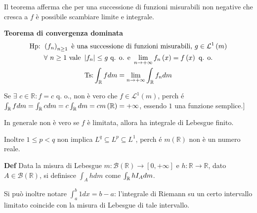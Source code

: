 \documentclass{article}
\begin{document}
Il teorema afferma che per una successione di funzioni misurabili non
negative che cresca a $f$ \`{e} possibile scambiare limite e integrale.

\textbf{Teorema di convergenza dominata}%
\begin{gather*}
\text{Hp: }\left( f_{n}\right) _{n\geq 1}\text{ \`{e} una successione di
funzioni misurabili, }g\in \mathcal{L}^{1}\left( m\right) \\
\forall \text{ }n\geq 1\text{ vale }\left\vert f_{n}\right\vert \leq g\text{
q. o. e }\lim_{n\rightarrow +\infty }f_{n}\left( x\right) =f\left( x\right) 
\text{ q. o.} \\
\text{Ts:}\int_{%
\mathbb{R}
}fdm=\lim_{n\rightarrow +\infty }\int_{%
\mathbb{R}
}f_{n}dm
\end{gather*}

Se $\exists $ $c\in 
\mathbb{R}
:f=c$ q. o., non \`{e} vero che $f\in \mathcal{L}^{1}\left( m\right) $, perch%
\'{e} $\int_{%
\mathbb{R}
}fdm=\int_{%
\mathbb{R}
}cdm=c\int_{%
\mathbb{R}
}dm=cm\left( 
\mathbb{R}
\right) =+\infty $, essendo $1$ una funzione semplice.]

In generale non \`{e} vero se $f$ \`{e} limitata, allora ha integrale di
Lebesgue finito.

Inoltre $1\leq p<q$ non implica $L^{q}\subseteq L^{p}\subseteq L^{1}$, perch%
\'{e} $m\left( 
\mathbb{R}
\right) $ non \`{e} un numero reale.

\textbf{Def }Data la misura di Lebesgue $m:\mathcal{B}\left( 
\mathbb{R}
\right) \rightarrow \left[ 0,+\infty \right] $ e $h:%
\mathbb{R}
\rightarrow 
\mathbb{R}
$, dato $A\in \mathcal{B}\left( 
\mathbb{R}
\right) $, si definisce $\int_{A}hdm$ come $\int_{%
\mathbb{R}
}hI_{A}dm$.

Si pu\`{o} inoltre notare $\int_{a}^{b}1dx=b-a$: l'integrale di Riemann su
un certo intervallo limitato coincide con la misura di Lebesgue di tale
intervallo.
\end{document}
